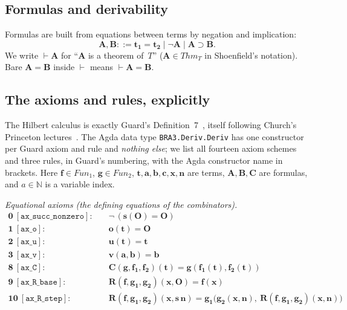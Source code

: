 \documentclass[11pt]{article}
\theoremstyle{plain}
\theoremstyle{definition}
\theoremstyle{remark}
\newcommand{\Fun}{\mathit{Fun}}
\newcommand{\Thmm}{\mathit{Thm}}
\begin{document}
\subsection{Formulas and derivability}

Formulas are built from equations between terms by negation and
implication:
\[
\mathbf{A}, \mathbf{B} ::= \mathbf{t_1} = \mathbf{t_2} \mid \neg \mathbf{A} \mid \mathbf{A} \supset \mathbf{B}.
\]
We write $\vdash \mathbf{A}$ for ``$\mathbf{A}$ is a theorem of~$T$''
($\mathbf{A} \in \Thmm_T$ in Shoenfield's notation).  Bare $\mathbf{A}
= \mathbf{B}$ inside $\vdash$ means $\vdash \mathbf{A} = \mathbf{B}$.

\subsection{The axioms and rules, explicitly}
\label{sec:axioms}

The Hilbert calculus is exactly Guard's Definition~7~\cite{Guard63},
itself following Church's Princeton lectures~\cite{Church}.  The Agda
data type \verb|BRA3.Deriv.Deriv| has one constructor per Guard axiom and
rule and \emph{nothing else}; we list all fourteen axiom schemes and
three rules, in Guard's numbering, with the Agda constructor name in
brackets.  Here $\mathbf{f} \in \Fun_1$, $\mathbf{g} \in \Fun_2$,
$\mathbf{t},\mathbf{a},\mathbf{b},\mathbf{c},\mathbf{x},\mathbf{n}$ are
terms, $\mathbf{A},\mathbf{B},\mathbf{C}$ are formulas, and $a \in
\mathbb{N}$ is a variable index.

\medskip
\noindent\emph{Equational axioms (the defining equations of the
combinators).}
\begin{align*}
\textbf{0}\ [\mathtt{ax\_succ\_nonzero}]:\quad & \neg\,(\mathbf{s}(\mathbf{O}) = \mathbf{O}) \\
\textbf{1}\ [\mathtt{ax\_o}]:\quad & \mathbf{o}(\mathbf{t}) = \mathbf{O} \\
\textbf{2}\ [\mathtt{ax\_u}]:\quad & \mathbf{u}(\mathbf{t}) = \mathbf{t} \\
\textbf{3}\ [\mathtt{ax\_v}]:\quad & \mathbf{v}(\mathbf{a},\mathbf{b}) = \mathbf{b} \\
\textbf{8}\ [\mathtt{ax\_C}]:\quad & \mathbf{C}(\mathbf{g},\mathbf{f_1},\mathbf{f_2})(\mathbf{t}) = \mathbf{g}(\mathbf{f_1}(\mathbf{t}), \mathbf{f_2}(\mathbf{t})) \\
\textbf{9}\ [\mathtt{ax\_R\_base}]:\quad & \mathbf{R}(\mathbf{f},\mathbf{g_1},\mathbf{g_2})(\mathbf{x}, \mathbf{O}) = \mathbf{f}(\mathbf{x}) \\
\textbf{10}\ [\mathtt{ax\_R\_step}]:\quad & \mathbf{R}(\mathbf{f},\mathbf{g_1},\mathbf{g_2})(\mathbf{x}, \mathbf{s}\,\mathbf{n}) = \mathbf{g_1}\bigl(\mathbf{g_2}(\mathbf{x},\mathbf{n}),\ \mathbf{R}(\mathbf{f},\mathbf{g_1},\mathbf{g_2})(\mathbf{x},\mathbf{n})\bigr)
\end{align*}
\end{document}
